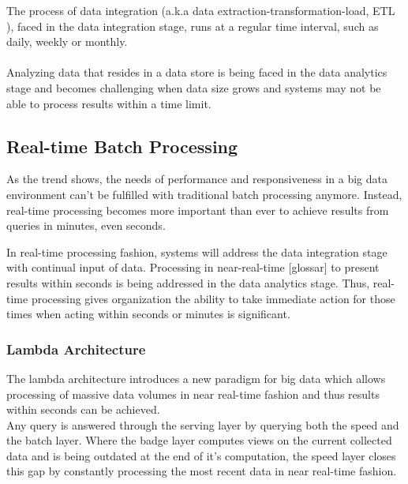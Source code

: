 The process of  data integration (a.k.a data extraction-transformation-load, ETL
), faced in the data integration stage, runs at a regular time
interval, such as daily, weekly or monthly. 
\\ \\
Analyzing data that resides in a data store is being faced in the data analytics
stage and becomes challenging when data size grows and systems may not be able
to process results within a time limit.
\cite{Liu:2014:SRP:2628194.2628251}

\subsection{Real-time Batch Processing}

As the trend shows, the needs of performance and responsiveness in a big data environment can't be fulfilled with 
traditional batch processing anymore. Instead, real-time processing becomes more 
important than ever to achieve results from queries in minutes, even seconds. 
\cite{bange2013big}

In real-time processing fashion, systems will address the data integration stage
with continual input of data. Processing in near-real-time [glossar] to present 
results within seconds is being addressed in the data analytics stage. Thus,
real-time processing gives organization the ability to take immediate action
for those times when acting within seconds or minutes is significant.
\cite{PrpSvyOfDSPS}

\subsubsection{Lambda Architecture}
The lambda architecture introduces a new paradigm for big data which allows
processing of massive data volumes in near real-time fashion and thus results within
seconds can be achieved. 
\\
Any query is answered through the serving layer by querying 
both the speed and the batch layer. Where the badge layer computes views on the current collected data and
is being outdated at the end of it's computation, the speed layer closes this 
gap by constantly processing the most recent data in near real-time fashion. 


\cite{marz2015big} \cite{PrpSvyOfDSPS}

